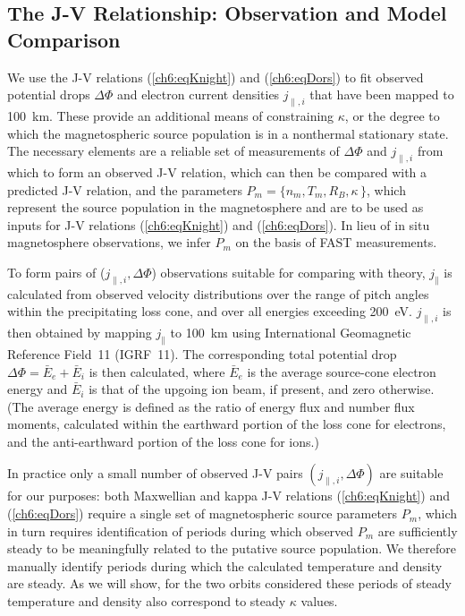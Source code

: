   \subsection{The J-V Relationship: Observation and Model Comparison} \label{ssJV}

  We use the J-V relations (\ref{ch6:eqKnight}) and (\ref{ch6:eqDors}) to fit
  observed potential drops $\Delta \Phi$ and electron current densities
  $j_{\parallel,i}$ that have been mapped to 100~km. These provide an additional
  means of constraining $\kappa$, or the degree to which the magnetospheric
  source population is in a nonthermal stationary state. The necessary elements
  are a reliable set of measurements of $\Delta \Phi$ and $j_{\parallel,i}$ from
  which to form an observed J-V relation, which can then be compared with a
  predicted J-V relation, and the parameters
  $P_m = \{ n_m, T_m, R_B, \kappa \, \}$, which represent the source population
  in the magnetosphere and are to be used as inputs for J-V relations
  (\ref{ch6:eqKnight}) and (\ref{ch6:eqDors}). In lieu of in situ magnetosphere
  observations, we infer $P_m$ on the basis of FAST measurements.

  To form pairs of ($j_{\parallel,i}, \Delta \Phi$) observations suitable for
  comparing with theory, $j_\parallel$ is calculated from observed velocity
  distributions over the range of pitch angles within the precipitating loss
  cone, and over all energies exceeding 200~eV.  $j_{\parallel,i}$ is then
  obtained by mapping $j_\parallel$ to 100~km using International Geomagnetic
  Reference Field~11 (IGRF~11). The corresponding total potential drop
  $\Delta \Phi = \bar{E}_e + \bar{E}_i$ is then calculated, where $\bar{E}_e$ is
  the average source-cone electron energy and $\bar{E}_i$ is that of the upgoing
  ion beam, if present, and zero otherwise. (The average energy is defined as
  the ratio of energy flux and number flux moments, calculated within the
  earthward portion of the loss cone for electrons, and the anti-earthward
  portion of the loss cone for ions.)

  In practice only a small number of observed J-V pairs
  $( j_{\parallel,i} , \Delta \Phi )$ are suitable for our purposes: both
  Maxwellian and kappa J-V relations (\ref{ch6:eqKnight}) and (\ref{ch6:eqDors})
  require a single set of magnetospheric source parameters $P_m$, which in turn
  requires identification of periods during which observed $P_m$ are
  sufficiently steady to be meaningfully related to the putative source
  population. We therefore manually identify periods during which the calculated
  temperature and density are steady. As we will show, for the two orbits
  considered these periods of steady temperature and density also correspond to
  steady $\kappa$ values.

